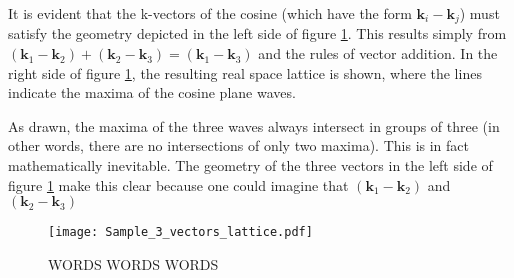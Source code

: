 \documentclass[11pt]{article}
\newcommand{\vk}{\mathbf{k}}
\begin{document}
It is evident that the k-vectors of the cosine (which have the form $\vk_i-\vk_j$) must satisfy the geometry depicted in the left side of figure \ref{fig:3-k-vects}.  This results simply from $(\vk_1-\vk_2) +(\vk_2-\vk_3) = (\vk_1-\vk_3)$ and the rules of vector addition.  In the right side of figure \ref{fig:3-k-vects}, the resulting real space lattice is shown, where the lines indicate the maxima of the cosine plane waves.  

As drawn, the maxima of the three waves always intersect in groups of three (in other words, there are no intersections of only two maxima).  This is in fact mathematically inevitable.  The geometry of the three vectors in the left side of figure \ref{fig:3-k-vects} make this clear because one could imagine that $(\vk_1-\vk_2)$ and $(\vk_2-\vk_3)$

\begin{figure}[h]
\centering
\texttt{[image: Sample\_3\_vectors\_lattice.pdf]}
\caption{WORDS WORDS WORDS}
\label{fig:3-k-vects}
\end{figure}
\end{document}
